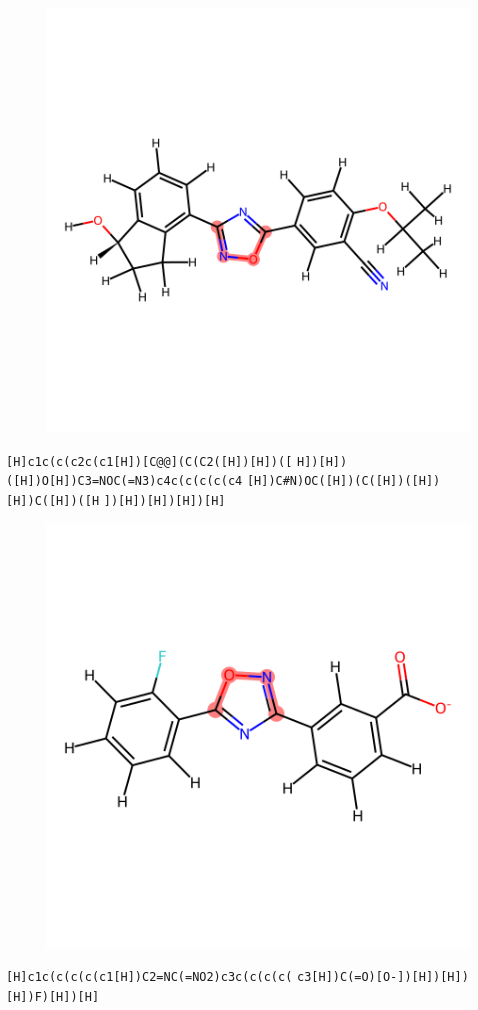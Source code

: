 \documentclass{article}
\begin{document}
\begin{figure}[ht]
\centering
    \includegraphics{mol196.png}
\end{figure}
\verb|[H]c1c(c(c2c(c1[H])[C@@](C(C2([H])[H])([| \verb|H])[H])([H])O[H])C3=NOC(=N3)c4c(c(c(c(c4| \verb|[H])C#N)OC([H])(C([H])([H])[H])C([H])([H| \verb|])[H])[H])[H])[H]|

\begin{figure}[ht]
\centering
    \includegraphics{mol197.png}
\end{figure}
\verb|[H]c1c(c(c(c(c1[H])C2=NC(=NO2)c3c(c(c(c(| \verb|c3[H])C(=O)[O-])[H])[H])[H])F)[H])[H]|
\end{document}
